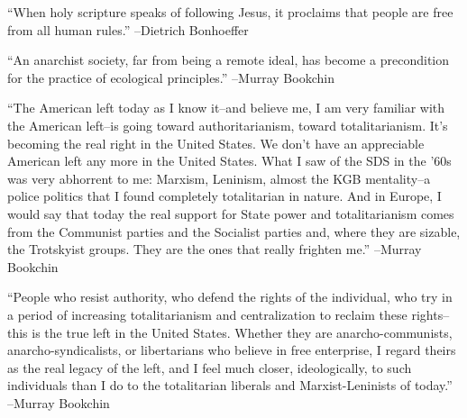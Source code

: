 \documentclass{article}%
\begin{document}
\linebreak%
\vspace{1mm}%
\begin{minipage}{\textwidth}%
\flushleft%
“When holy scripture speaks of following Jesus, it proclaims that people are free from all human rules.”%
\linebreak%
\vspace{1mm}%
–Dietrich Bonhoeffer%
\linebreak%
\vspace{1mm}%
\end{minipage}%
\linebreak%
\vspace{1mm}%
\begin{minipage}{\textwidth}%
\flushleft%
“An anarchist society, far from being a remote ideal, has become a precondition for the practice of ecological principles.”%
\linebreak%
\vspace{1mm}%
–Murray Bookchin%
\linebreak%
\vspace{1mm}%
\end{minipage}%
\linebreak%
\vspace{1mm}%
\begin{minipage}{\textwidth}%
\flushleft%
“The American left today as I know it–and believe me, I am very familiar with the American left–is going toward authoritarianism, toward totalitarianism. It's becoming the real right in the United States. We don't have an appreciable American left any more in the United States. What I saw of the SDS in the '60s was very abhorrent to me: Marxism, Leninism, almost the KGB mentality–a police politics that I found completely totalitarian in nature. And in Europe, I would say that today the real support for State power and totalitarianism comes from the Communist parties and the Socialist parties and, where they are sizable, the Trotskyist groups. They are the ones that really frighten me.”%
\linebreak%
\vspace{1mm}%
–Murray Bookchin%
\linebreak%
\vspace{1mm}%
\end{minipage}%
\linebreak%
\vspace{1mm}%
\begin{minipage}{\textwidth}%
\flushleft%
“People who resist authority, who defend the rights of the individual, who try in a period of increasing totalitarianism and centralization to reclaim these rights–this is the true left in the United States. Whether they are anarcho{-}communists, anarcho{-}syndicalists, or libertarians who believe in free enterprise, I regard theirs as the real legacy of the left, and I feel much closer, ideologically, to such individuals than I do to the totalitarian liberals and Marxist{-}Leninists of today.”%
\linebreak%
\vspace{1mm}%
–Murray Bookchin%
\linebreak%
\vspace{1mm}%
\end{minipage}%
\end{document}
